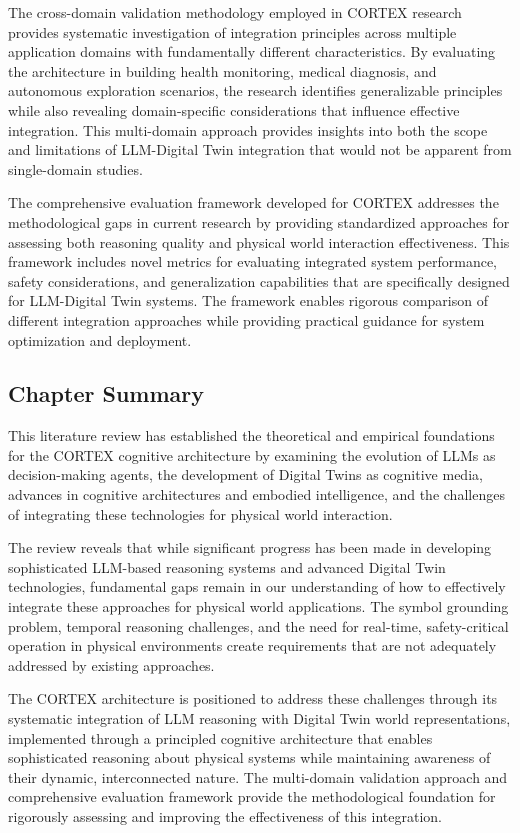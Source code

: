 The cross-domain validation methodology employed in CORTEX research provides systematic investigation of integration principles across multiple application domains with fundamentally different characteristics. By evaluating the architecture in building health monitoring, medical diagnosis, and autonomous exploration scenarios, the research identifies generalizable principles while also revealing domain-specific considerations that influence effective integration. This multi-domain approach provides insights into both the scope and limitations of LLM-Digital Twin integration that would not be apparent from single-domain studies.

The comprehensive evaluation framework developed for CORTEX addresses the methodological gaps in current research by providing standardized approaches for assessing both reasoning quality and physical world interaction effectiveness. This framework includes novel metrics for evaluating integrated system performance, safety considerations, and generalization capabilities that are specifically designed for LLM-Digital Twin systems. The framework enables rigorous comparison of different integration approaches while providing practical guidance for system optimization and deployment.

\subsection{Chapter Summary}

This literature review has established the theoretical and empirical foundations for the CORTEX cognitive architecture by examining the evolution of LLMs as decision-making agents, the development of Digital Twins as cognitive media, advances in cognitive architectures and embodied intelligence, and the challenges of integrating these technologies for physical world interaction.

The review reveals that while significant progress has been made in developing sophisticated LLM-based reasoning systems and advanced Digital Twin technologies, fundamental gaps remain in our understanding of how to effectively integrate these approaches for physical world applications. The symbol grounding problem, temporal reasoning challenges, and the need for real-time, safety-critical operation in physical environments create requirements that are not adequately addressed by existing approaches.

The CORTEX architecture is positioned to address these challenges through its systematic integration of LLM reasoning with Digital Twin world representations, implemented through a principled cognitive architecture that enables sophisticated reasoning about physical systems while maintaining awareness of their dynamic, interconnected nature. The multi-domain validation approach and comprehensive evaluation framework provide the methodological foundation for rigorously assessing and improving the effectiveness of this integration.

